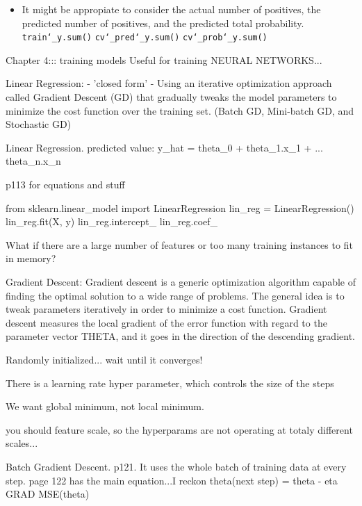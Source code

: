 \begin{itemize}
\item
It might be appropiate to consider
the actual number of positives,
the predicted number of positives,
and the predicted total probability.\newline
\texttt{train\char`_y.sum()}\newline
\texttt{cv\char`_pred\char`_y.sum()}\newline
\texttt{cv\char`_prob\char`_y.sum()}\newline

\end{itemize}










Chapter 4::: training models
Useful for training NEURAL NETWORKS...

Linear Regression:
- 'closed form'
-
Using an iterative optimization approach called Gradient Descent (GD)
that gradually tweaks the model parameters to minimize the cost function over the training set.
(Batch GD, Mini-batch GD, and Stochastic GD)

Linear Regression.
predicted value: y_hat = theta_0 + theta_1.x_1 + ... theta_n.x_n

p113 for equations and stuff

from sklearn.linear_model import LinearRegression
lin_reg = LinearRegression()
lin_reg.fit(X, y)
lin_reg.intercept_
lin_reg.coef_

What if there are a large number of features
or too many training instances to fit in memory?

Gradient Descent:
Gradient descent is a generic optimization algorithm capable of finding the optimal solution to a wide range of problems. 
The general idea is to tweak parameters iteratively in order to minimize a cost function.
Gradient descent measures the local gradient of the error function with regard to the parameter vector THETA,
and it goes in the direction of the descending gradient.

Randomly initialized... wait until it converges!

There is a learning rate hyper parameter, which controls the size of the steps

We want global minimum, not local minimum.

you should feature scale, so the hyperparams are not operating at totaly different scales...

Batch Gradient Descent. p121.
It uses the whole batch of training data at every step.
page 122 has the main equation...I reckon
theta(next step) = theta - eta GRAD MSE(theta)

